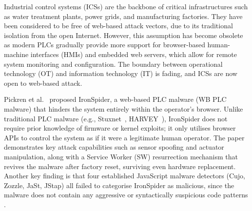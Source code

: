 \documentclass[conference]{IEEEtran}
\begin{document}
Industrial control systems (ICSs) are the backbone of critical infrastructures such as water treatment plants, power grids, and manufacturing factories. They have been considered to be free of web-based attack vectors, due to its traditional isolation from the open Internet. However, this assumption has become obsolete as modern PLCs gradually provide more support for browser-based human-machine interfaces (HMIs) and embedded web servers, which allow for remote system monitoring and configuration. The boundary between operational technology (OT) and information technology (IT) is fading, and ICSs are now open to web-based attack.

Pickren et al.~\cite{ironspider2024} proposed IronSpider, a
web-based PLC malware (WB PLC malware) that hinders the system entirely within the
operator's browser. Unlike traditional PLC malware (e.g., Stuxnet~\cite{stuxnet}, HARVEY~\cite{harvey2017}), IronSpider does not require prior knowledge of firmware or kernel exploits; it only utilises browser APIs to control the system as if it were a legitimate human operator. The paper demonstrates key attack capabilities such as sensor spoofing and actuator manipulation, along with a Service Worker (SW) resurrection mechanism that revives the malware after factory reset, surviving even hardware replacement. Another key finding is that four established JavaScript malware detectors (Cujo, Zozzle, JaSt, JStap) all failed to categorise IronSpider as malicious, since the malware does not contain any aggressive or syntactically suspicious code patterns \cite{ironspider2024}.
\end{document}
